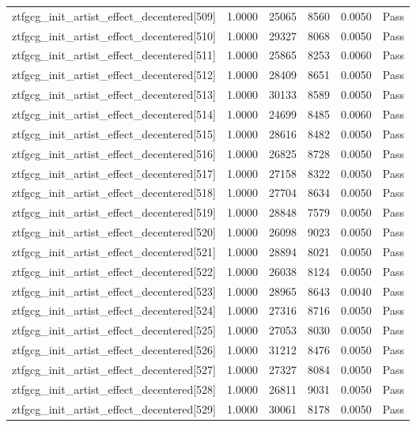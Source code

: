 \begin{table}[htbp]
\begin{tabular}{llrrll}
ztfgcg\_init\_artist\_effect\_decentered[509] & 1.0000 & 25065 & 8560 & 0.0050 & Pass \\
ztfgcg\_init\_artist\_effect\_decentered[510] & 1.0000 & 29327 & 8068 & 0.0050 & Pass \\
ztfgcg\_init\_artist\_effect\_decentered[511] & 1.0000 & 25865 & 8253 & 0.0060 & Pass \\
ztfgcg\_init\_artist\_effect\_decentered[512] & 1.0000 & 28409 & 8651 & 0.0050 & Pass \\
ztfgcg\_init\_artist\_effect\_decentered[513] & 1.0000 & 30133 & 8589 & 0.0050 & Pass \\
ztfgcg\_init\_artist\_effect\_decentered[514] & 1.0000 & 24699 & 8485 & 0.0060 & Pass \\
ztfgcg\_init\_artist\_effect\_decentered[515] & 1.0000 & 28616 & 8482 & 0.0050 & Pass \\
ztfgcg\_init\_artist\_effect\_decentered[516] & 1.0000 & 26825 & 8728 & 0.0050 & Pass \\
ztfgcg\_init\_artist\_effect\_decentered[517] & 1.0000 & 27158 & 8322 & 0.0050 & Pass \\
ztfgcg\_init\_artist\_effect\_decentered[518] & 1.0000 & 27704 & 8634 & 0.0050 & Pass \\
ztfgcg\_init\_artist\_effect\_decentered[519] & 1.0000 & 28848 & 7579 & 0.0050 & Pass \\
ztfgcg\_init\_artist\_effect\_decentered[520] & 1.0000 & 26098 & 9023 & 0.0050 & Pass \\
ztfgcg\_init\_artist\_effect\_decentered[521] & 1.0000 & 28894 & 8021 & 0.0050 & Pass \\
ztfgcg\_init\_artist\_effect\_decentered[522] & 1.0000 & 26038 & 8124 & 0.0050 & Pass \\
ztfgcg\_init\_artist\_effect\_decentered[523] & 1.0000 & 28965 & 8643 & 0.0040 & Pass \\
ztfgcg\_init\_artist\_effect\_decentered[524] & 1.0000 & 27316 & 8716 & 0.0050 & Pass \\
ztfgcg\_init\_artist\_effect\_decentered[525] & 1.0000 & 27053 & 8030 & 0.0050 & Pass \\
ztfgcg\_init\_artist\_effect\_decentered[526] & 1.0000 & 31212 & 8476 & 0.0050 & Pass \\
ztfgcg\_init\_artist\_effect\_decentered[527] & 1.0000 & 27327 & 8084 & 0.0050 & Pass \\
ztfgcg\_init\_artist\_effect\_decentered[528] & 1.0000 & 26811 & 9031 & 0.0050 & Pass \\
ztfgcg\_init\_artist\_effect\_decentered[529] & 1.0000 & 30061 & 8178 & 0.0050 & Pass \\

\end{tabular}
\end{table}
